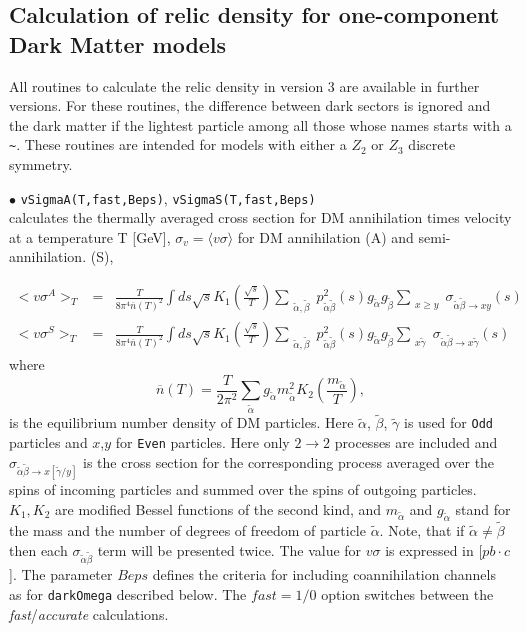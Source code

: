 \documentclass[12pt,a4paper]{article}
\begin{document}
  

\subsection{Calculation of relic density for one-component Dark Matter models}
\label{sec:one_component}
All routines to calculate the relic density in  version 3 are  available in further versions. For these routines,  the difference between 
 dark sectors is ignored and the dark matter if the lightest particle among all those whose names starts with a \verb|~|. These routines are intended for models with either a $Z_2$ or $Z_3$ discrete symmetry.
  
\noindent
$\bullet$ \verb|vSigmaA(T,fast,Beps)|,  \verb|vSigmaS(T,fast,Beps)|\\
calculates the thermally averaged cross section for DM annihilation  times velocity  
at a  temperature T [GeV], $\sigma_v=\langle v\sigma \rangle$  for DM annihilation (A)  and semi-annihilation. (S), 

\begin{eqnarray}
\label{vSigmaA}
<v\sigma^A>_T &=& \frac{T}{8\pi^4  \overline{n}(T)^2} \int ds\sqrt{s} K_1\left(\frac{\sqrt{s}}{T}\right)   
\sum_{\substack{
\tilde\alpha ,\tilde\beta }}  p_{\tilde\alpha\tilde\beta}^2(s) g_{\tilde\alpha} g_{\tilde\beta} 
\sum_{\substack{ x \ge y }} {\sigma}_{\tilde\alpha\tilde\beta\to x y}(s)\\
\label{vSigmaS}
<v\sigma^S>_T &=& \frac{T}{8\pi^4  \overline{n}(T)^2} \int ds\sqrt{s} K_1\left(\frac{\sqrt{s}}{T}\right)   
\sum_{\substack{
\tilde\alpha ,\tilde\beta }}  p_{\tilde\alpha\tilde\beta}^2(s) g_{\tilde\alpha} g_{\tilde\beta} 
 \sum_{\substack{x  \tilde\gamma }}
 {\sigma}_{\tilde\alpha\tilde\beta\to x\tilde\gamma}(s)
\end{eqnarray}
where 
\begin{equation}
\label{nEqtot}
\overline{n}(T)=\frac{T}{2\pi^2 } \sum_{\tilde\alpha} g_{\tilde\alpha} m^2_{\tilde\alpha} K_2(\frac{m_{\tilde\alpha}}{T}),
\end{equation}
 is the equilibrium number density of DM particles.
Here  $\tilde\alpha$, $\tilde\beta$, $\tilde\gamma$  is used for  {\tt Odd} particles and $x$,$y$
for {\tt Even}  particles.  Here only $2\to 2$ processes are included and   ${\sigma}_{\tilde\alpha\tilde\beta\to x[\tilde\gamma/y]} $ is the cross section for the 
corresponding  process  averaged over the spins of incoming particles and summed
over the spins of outgoing particles.
 $K_1,K_2$ are modified Bessel functions of the second kind, and 
$m_{\tilde\alpha}$ and $g_{\tilde\alpha}$ stand for the  mass and the number of degrees of freedom of particle $\tilde\alpha$.
Note, that if $\tilde\alpha \ne \tilde\beta$ then each
${\sigma}_{\tilde\alpha\tilde\beta}$ term will be presented  twice.
The value for $v\sigma$  is expressed in [$pb\cdot c$].  The parameter $Beps$ defines the criteria for including coannihilation
channels as for {\tt darkOmega} described below.
The $fast=1/0$ option switches between the {\it fast}/{\it accurate} calculations. 
\end{document}
